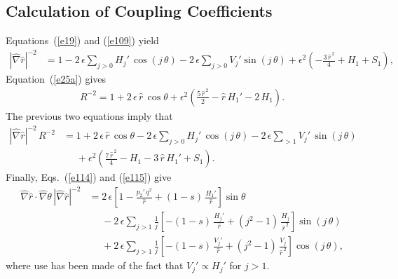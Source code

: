 \documentclass[12pt,prb,aps,notitlepage]{revtex4-1}
\begin{document}
\subsection{Calculation of Coupling Coefficients}
Equations~(\ref{e19}) and (\ref{e109}) yield 
\begin{align}\label{e115}
|\hat{\nabla}\hat{r}|^{-2} &= 1 - 2\,\epsilon\sum_{j>0}H_j'\,\cos(j\,\theta) - 2\,\epsilon\sum_{j>0}V_j'\sin(j\,\theta)
+ \epsilon^2\left(-\frac{3\,\hat{r}^{\,2}}{4} + H_1 + S_1\right),
\end{align}
Equation~(\ref{e25a}) gives
\begin{align}
R^{-2}= 1 + 2\,\epsilon\,\hat{r}\,\cos\theta +\epsilon^2\left(\frac{5\,\hat{r}^{\,2}}{2} - \hat{r}\,H_1'-2\,H_1\right).
\end{align}
The previous two equations imply that
\begin{align}\label{e117}
|\hat{\nabla}\hat{r}|^{-2} \,R^{-2}&= 1 +2\,\epsilon\,\hat{r}\,\cos\theta -2\,\epsilon \sum_{j>0}H_j'\,\cos(j\,\theta) -2\,\epsilon\sum_{>1}V_j'\,\sin(j\,\theta)\nonumber\\[0.5ex]
&\phantom{=} + \epsilon^2\left(\frac{7\,\hat{r}^{\,2}}{4} - H_1 -3\,\hat{r}\,H_1' + S_1\right).
\end{align}
Finally, Eqs.~(\ref{e114}) and (\ref{e115}) give
\begin{align}\label{e118}
\hat{\nabla}\hat{r}\cdot\hat{\nabla}\theta \,|\hat{\nabla}\hat{r}|^{-2} &= 2\,\epsilon\left[1-\frac{p_2'\,q^2}{\hat{r}} +(1-s)\,\frac{H_1'}{\hat{r}}\right]\sin\theta\nonumber\\[0.5ex]
&\phantom{=}-2\,\epsilon\sum_{j>1}\frac{1}{j}\left[-(1-s)\,\frac{H_j'}{\hat{r}} + (j^2-1)\,\frac{H_j}{\hat{r}^{\,2}}\right]\sin(j\,\theta)\nonumber\\[0.5ex]
&\phantom{=}+2\,\epsilon\sum_{j>1}\frac{1}{j}\left[-(1-s)\,\frac{V_j'}{\hat{r}} + (j^2-1)\,\frac{V_j}{\hat{r}^{\,2}}\right]\cos(j\,\theta),
\end{align}
where use has been made of the fact that $V_j'\propto H_j'$ for $j>1$. 
\end{document}
